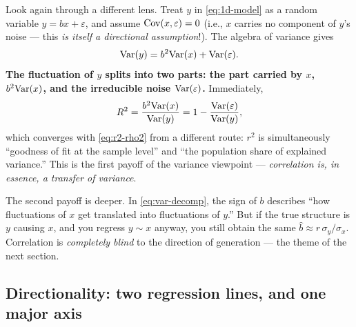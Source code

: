 Look again through a different lens. Treat $y$ in \eqref{eq:1d-model} as a random variable $y = bx + \varepsilon$, and assume $\mathrm{Cov}(x, \varepsilon) = 0$ (i.e., $x$ carries no component of $y$'s noise --- this \textit{is itself a directional assumption}!). The algebra of variance gives
\begin{equation}\label{eq:var-decomp}
  \mathrm{Var}(y) = b^2 \mathrm{Var}(x) + \mathrm{Var}(\varepsilon).
\end{equation}
\textbf{The fluctuation of $y$ splits into two parts: the part carried by $x$, $b^2\mathrm{Var}(x)$, and the irreducible noise $\mathrm{Var}(\varepsilon)$.} Immediately,
\begin{equation}\label{eq:r2-var}
  R^2 = \frac{b^2 \mathrm{Var}(x)}{\mathrm{Var}(y)} = 1 - \frac{\mathrm{Var}(\varepsilon)}{\mathrm{Var}(y)},
\end{equation}
which converges with \eqref{eq:r2-rho2} from a different route: $r^2$ is simultaneously ``goodness of fit at the sample level'' and ``the population share of explained variance.'' This is the first payoff of the variance viewpoint --- \textit{correlation is, in essence, a transfer of variance}.

The second payoff is deeper. In \eqref{eq:var-decomp}, the sign of $b$ describes ``how fluctuations of $x$ get translated into fluctuations of $y$.'' But if the true structure is $y$ causing $x$, and you regress $y \sim x$ anyway, you still obtain the same $\hat{b} \approx r\,\sigma_y/\sigma_x$. Correlation is \textit{completely blind} to the direction of generation --- the theme of the next section.

\subsection{Directionality: two regression lines, and one major axis}\label{sec:1d-direction}


